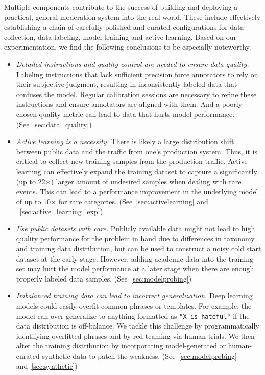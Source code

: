 \documentclass[letterpaper]{article} %
\begin{document}
Multiple components contribute to the success of building and deploying a practical, general moderation system into the real world. These include effectively establishing a chain of carefully polished and curated configurations for data collection, data labeling, model training and active learning. Based on our experimentation, we find the following conclusions to be especially noteworthy.
\begin{itemize}
    \item \textit{Detailed instructions and quality control are needed to ensure data quality.} Labeling instructions that lack sufficient precision force annotators to rely on their subjective judgment, resulting in inconsistently labeled data that confuses the model. Regular calibration sessions are necessary to refine these instructions and ensure annotators are aligned with them. And a poorly chosen quality metric can lead to data that hurts model performance. (See~\cref{sec:data_quality})
    \item \textit{Active learning is a necessity.} There is likely a large distribution shift between public data and the traffic from one's production system. Thus, it is critical to collect new training samples from the production traffic. Active learning can effectively expand the training dataset to capture a significantly (up to 22$\times$) larger amount of undesired samples when dealing with rare events. This can lead to a performance improvement in the underlying model of up to 10$\times$ for rare categories. (See~\cref{sec:activelearning} and ~\cref{sec:active_learning_exp})
    \item \textit{Use public datasets with care.} Publicly available data might not lead to high quality performance for the problem in hand due to differences in taxonomy and training data distribution, but can be used to construct a noisy cold start dataset at the early stage. However, adding academic data into the training set may hurt the model performance at a later stage when there are enough properly labeled data samples. (See~\ref{sec:modelprobing})
    \item \textit{Imbalanced training data can lead to incorrect generalization.} Deep learning models could easily overfit common phrases or templates. For example, the model can over-generalize to anything formatted as \texttt{"X is hateful"} if the data distribution is off-balance. We tackle this challenge by programmatically identifying overfitted phrases and by red-teaming via human trials. We then alter the training distribution by incorporating model-generated or human-curated synthetic data to patch the weakness. (See~\cref{sec:modelprobing} and~\cref{sec:synthetic})

\end{itemize}
\end{document}
